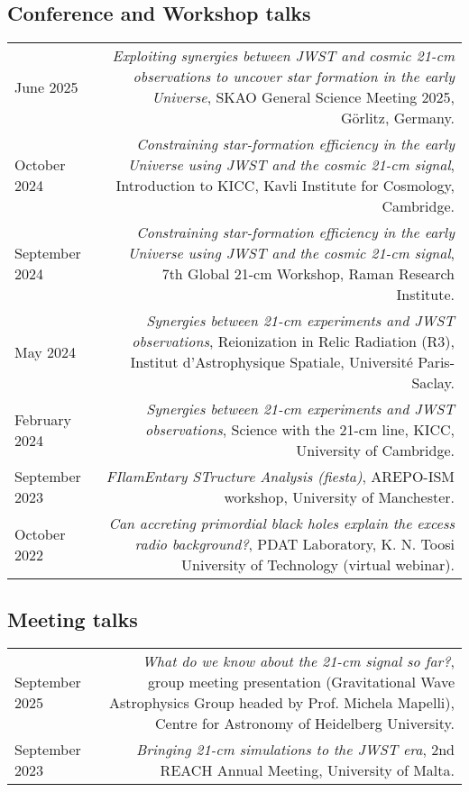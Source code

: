 \documentclass{article}
\begin{document}
\subsection*{Conference and Workshop talks}
\begin{longtable}{L!{\vrule}R}

    June 2025 & \textit{Exploiting synergies between JWST and cosmic 21-cm observations to uncover star formation in the early Universe}, SKAO General Science Meeting 2025, Görlitz, Germany. \\

    October 2024 & \textit{Constraining star-formation efficiency in the early Universe using JWST and the cosmic 21-cm signal}, Introduction to KICC, Kavli Institute for Cosmology, Cambridge. \\

    September 2024 & \textit{Constraining star-formation efficiency in the early Universe using JWST and the cosmic 21-cm signal}, 7th Global 21-cm Workshop, Raman Research Institute. \\

    May 2024 & \textit{Synergies between 21-cm experiments and JWST observations}, Reionization in Relic Radiation (R3), Institut d'Astrophysique Spatiale, Université Paris-Saclay. \\

    February 2024 & \textit{Synergies between 21-cm experiments and JWST observations}, Science with the 21-cm line, KICC, University of Cambridge. \\

    September 2023 & \textit{FIlamEntary STructure Analysis (fiesta)}, AREPO-ISM workshop, University of Manchester. \\

    October 2022 & \textit{Can accreting primordial black holes explain the excess radio background?}, PDAT Laboratory, K. N. Toosi University of Technology (virtual webinar). \\

\end{longtable}


\subsection*{Meeting talks}
\begin{longtable}{L!{\vrule}R}

    September 2025 & \textit{What do we know about the 21-cm signal so far?}, group meeting presentation (Gravitational Wave Astrophysics Group headed by Prof. Michela Mapelli), Centre for Astronomy of Heidelberg University. \\

    September 2023 & \textit{Bringing 21-cm simulations to the JWST era}, 2nd REACH Annual Meeting, University of Malta. \\

\end{longtable}
\end{document}
